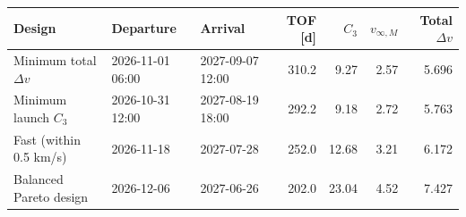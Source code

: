 \begin{tabular}{p{}llrrrr}
\toprule
Design & Departure & Arrival & TOF [d] & $C_3$ & $v_{\infty,M}$ & Total $\Delta v$ \\
\midrule
Minimum total $\Delta v$ & 2026-11-01 06:00 & 2027-09-07 12:00 & 310.2 & 9.27 & 2.57 & 5.696 \\
Minimum launch $C_3$ & 2026-10-31 12:00 & 2027-08-19 18:00 & 292.2 & 9.18 & 2.72 & 5.763 \\
Fast (within 0.5 km/s) & 2026-11-18 & 2027-07-28 & 252.0 & 12.68 & 3.21 & 6.172 \\
Balanced Pareto design & 2026-12-06 & 2027-06-26 & 202.0 & 23.04 & 4.52 & 7.427 \\
\bottomrule
\end{tabular}